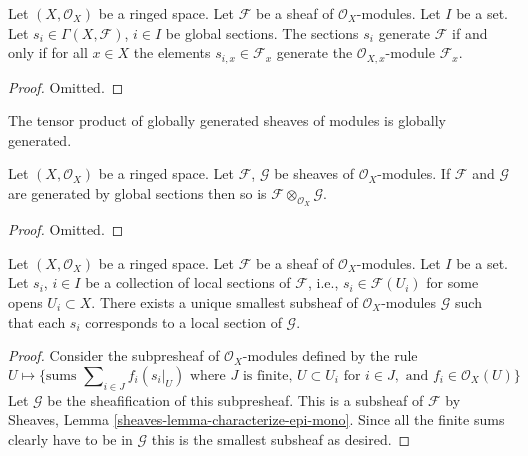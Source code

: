 \begin{lemma}
\label{lemma-globally-generated}
Let $(X, \mathcal{O}_X)$ be a ringed space.
Let $\mathcal{F}$ be a sheaf of $\mathcal{O}_X$-modules.
Let $I$ be a set. Let
$s_i \in \Gamma(X, \mathcal{F})$, $i \in I$
be global sections. The sections $s_i$ generate
$\mathcal{F}$ if and only if for all $x\in X$ the
elements $s_{i, x} \in \mathcal{F}_x$ generate
the $\mathcal{O}_{X, x}$-module $\mathcal{F}_x$.
\end{lemma}

\begin{proof}
Omitted.
\end{proof}

\begin{lemma}
\label{lemma-tensor-product-globally-generated}
\begin{slogan}
The tensor product of globally generated sheaves of modules is
globally generated.
\end{slogan}
Let $(X, \mathcal{O}_X)$ be a ringed space.
Let $\mathcal{F}$, $\mathcal{G}$ be sheaves of $\mathcal{O}_X$-modules.
If $\mathcal{F}$ and $\mathcal{G}$ are generated by global sections
then so is $\mathcal{F} \otimes_{\mathcal{O}_X} \mathcal{G}$.
\end{lemma}

\begin{proof}
Omitted.
\end{proof}

\begin{lemma}
\label{lemma-generated-by-local-sections}
Let $(X, \mathcal{O}_X)$ be a ringed space.
Let $\mathcal{F}$ be a sheaf of $\mathcal{O}_X$-modules.
Let $I$ be a set. Let $s_i$, $i \in I$ be a collection
of local sections of $\mathcal{F}$, i.e., $s_i \in \mathcal{F}(U_i)$
for some opens $U_i \subset X$. There exists a unique smallest
subsheaf of $\mathcal{O}_X$-modules $\mathcal{G}$ such
that each $s_i$ corresponds to a local section of
$\mathcal{G}$.
\end{lemma}

\begin{proof}
Consider the subpresheaf of $\mathcal{O}_X$-modules
defined by the rule
$$
U
\longmapsto
\{
\text{sums } \sum\nolimits_{i \in J} f_i (s_i|_U)
\text{ where } J \text{ is finite, }
U \subset U_i \text{ for } i\in J, \text{ and }
f_i \in \mathcal{O}_X(U)
\}
$$
Let $\mathcal{G}$ be the sheafification of this subpresheaf.
This is a subsheaf of $\mathcal{F}$ by
Sheaves, Lemma \ref{sheaves-lemma-characterize-epi-mono}.
Since all the finite sums clearly have to be in $\mathcal{G}$
this is the smallest subsheaf as desired.
\end{proof}

